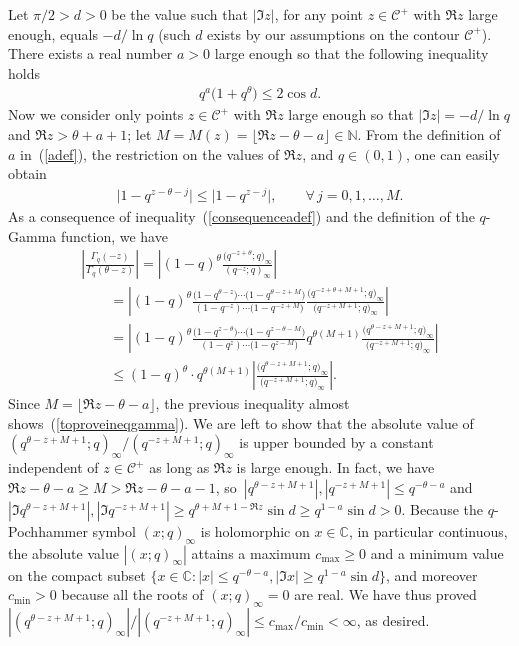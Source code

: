 \documentclass[11pt]{article}
\numberwithin{equation}{section}
\newcommand{\C}{\mathbb{C}}
\newcommand{\N}{\mathbb{N}}
\newcommand{\CC}{\mathcal{C}}
\begin{document}
Let $\pi/2 > d>0$ be the value such that $|\Im z|$, for any point $z\in\CC^+$ with $\Re z$ large enough, equals $-d/\ln{q}$ (such $d$ exists by our assumptions on the contour $\CC^+$). There exists a real number $a > 0$ large enough so that the following inequality holds
\begin{gather}\label{adef}
q^a\big(1 + q^{\theta}\big) \leq 2 \cos d.
\end{gather}
Now we consider only points $z\in\CC^+$ with $\Re z$ large enough so that $|\Im z| = -d/\ln{q}$ and $\Re z > \theta + a + 1$; let $M = M(z) = \lfloor \Re z - \theta - a \rfloor \in\N$. From the def\/inition of~$a$ in~(\ref{adef}), the restriction on the values of $\Re z$, and $q\in (0, 1)$, one can easily obtain
\begin{gather}\label{consequenceadef}
\big|1 - q^{z - \theta - j}\big| \leq \big|1 - q^{z - j}\big|, \qquad \forall\, j = 0, 1, \dots, M.
\end{gather}
As a consequence of inequality~(\ref{consequenceadef}) and the def\/inition of the $q$-Gamma function, we have
\begin{gather*}
\left| \frac{\Gamma_q(-z)}{\Gamma_q(\theta - z)} \right| = \left| (1 - q)^{\theta}\frac{\big(q^{-z+\theta}; q\big)_{\infty}}{(q^{-z}; q)_{\infty}} \right|\\
 \qquad{} = \left| (1 - q)^{\theta}\frac{\big(1 - q^{\theta - z}\big)\cdots \big(1 - q^{\theta - z + M}\big)}{(1 - q^{-z})\cdots\big(1 - q^{-z+M}\big)}\frac{\big(q^{-z+\theta+M+1}; q\big)_{\infty}}{\big(q^{-z+M+1}; q\big)_{\infty}} \right|\\
\qquad{} = \left| (1 - q)^{\theta}\frac{\big(1 - q^{z - \theta}\big)\cdots\big(1 - q^{z - \theta - M}\big)}{(1 - q^z)\cdots \big(1 - q^{z-M}\big)}q^{\theta(M+1)}\frac{\big(q^{\theta - z + M + 1}; q\big)_{\infty}}{\big(q^{-z+M+1}; q\big)_{\infty}} \right|\\
\qquad{} \leq (1 - q)^{\theta}\cdot q^{\theta(M+1)} \left| \frac{\big(q^{\theta-z+M+1}; q\big)_{\infty}}{\big(q^{-z+M+1}; q\big)_{\infty}} \right|.
\end{gather*}
Since $M = \lfloor \Re z - \theta - a\rfloor$, the previous inequality almost shows~(\ref{toproveineqgamma}).
We are left to show that the absolute value of $(q^{\theta-z+M+1}; q)_{\infty}/(q^{-z+M+1}; q)_{\infty}$ is upper bounded by a constant independent of $z\in\CC^+$ as long as $\Re z$ is large enough.
In fact, we have $\Re z - \theta - a\geq M > \Re z - \theta - a - 1$, so~$|q^{\theta-z+M+1}|, |q^{-z+M+1}|\leq q^{-\theta-a}$ and $|\Im q^{\theta - z + M + 1}|, |\Im q^{-z+M+1}| \geq q^{\theta + M + 1 - \Re z}\sin d \geq q^{1-a}\sin d > 0$. Because the $q$-Pochhammer symbol $(x; q)_{\infty}$ is holomorphic on $x\in\C$, in particular continuous, the absolute value $|(x; q)_{\infty}|$ attains a maximum $c_{\max}\geq 0$ and a minimum value  on the compact subset $\{x\in\C\colon |x| \leq q^{-\theta-a}, |\Im x| \geq q^{1-a}\sin d\}$, and moreover $c_{\min} > 0$ because all the roots of $(x; q)_{\infty} = 0$ are real. We have thus proved $|(q^{\theta-z+M+1}; q)_{\infty}|/|(q^{-z+M+1}; q)_{\infty}| \leq c_{\max}/c_{\min} < \infty$, as desired.
\end{document}

